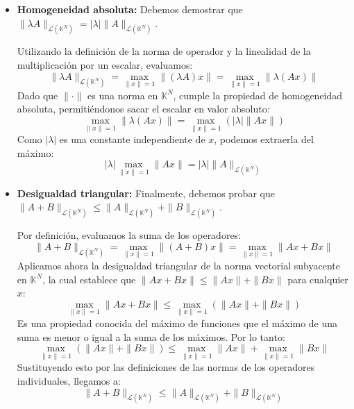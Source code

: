 {\begin{itemize}
        Para cualquier vector arbitrario $y \neq 0$ en $\mathbb{K}^N$, podemos construir el vector unitario $u = \frac{y}{\|y\|}$. Aplicando la linealidad del operador $A$:
        $$ A(u) = A\left(\frac{y}{\|y\|}\right) = \frac{1}{\|y\|} Ay = 0 \implies Ay = 0 $$
        Como $A0 = 0$ trivialmente, concluimos que $Ay = 0$ para todo $y \in \mathbb{K}^N$, lo que significa que $A$ es el operador nulo ($A = 0$). 

        La implicación inversa es directa: si $A = 0$, entonces $Ax = 0$ para todo $x$, lo que hace que $\|Ax\| = 0$ y, por tanto, su máximo sobre los vectores unitarios es $0$.

        \item \textbf{Homogeneidad absoluta:}
        Debemos demostrar que $\|\lambda A\|_{\mathcal{L}(\mathbb{K}^N)} = |\lambda| \|A\|_{\mathcal{L}(\mathbb{K}^N)}$.

        Utilizando la definición de la norma de operador y la linealidad de la multiplicación por un escalar, evaluamos:
        $$ \|\lambda A\|_{\mathcal{L}(\mathbb{K}^N)} = \max_{\|x\| = 1} \|(\lambda A)x\| = \max_{\|x\| = 1} \|\lambda (Ax)\| $$
        Dado que $\|\cdot\|$ es una norma en $\mathbb{K}^N$, cumple la propiedad de homogeneidad absoluta, permitiéndonos sacar el escalar en valor absoluto:
        $$ \max_{\|x\| = 1} \|\lambda (Ax)\| = \max_{\|x\| = 1} \left( |\lambda| \|Ax\| \right) $$
        Como $|\lambda|$ es una constante independiente de $x$, podemos extraerla del máximo:
        $$ |\lambda| \max_{\|x\| = 1} \|Ax\| = |\lambda| \|A\|_{\mathcal{L}(\mathbb{K}^N)} $$

        \item \textbf{Desigualdad triangular:}
        Finalmente, debemos probar que $\|A + B\|_{\mathcal{L}(\mathbb{K}^N)} \leq \|A\|_{\mathcal{L}(\mathbb{K}^N)} + \|B\|_{\mathcal{L}(\mathbb{K}^N)}$.

        Por definición, evaluamos la suma de los operadores:
        $$ \|A + B\|_{\mathcal{L}(\mathbb{K}^N)} = \max_{\|x\| = 1} \|(A + B)x\| = \max_{\|x\| = 1} \|Ax + Bx\| $$
        Aplicamos ahora la desigualdad triangular de la norma vectorial subyacente en $\mathbb{K}^N$, la cual establece que $\|Ax + Bx\| \leq \|Ax\| + \|Bx\|$ para cualquier $x$:
        $$ \max_{\|x\| = 1} \|Ax + Bx\| \leq \max_{\|x\| = 1} \left( \|Ax\| + \|Bx\| \right) $$
        Es una propiedad conocida del máximo de funciones que el máximo de una suma es menor o igual a la suma de los máximos. Por lo tanto:
        $$ \max_{\|x\| = 1} \left( \|Ax\| + \|Bx\| \right) \leq \max_{\|x\| = 1} \|Ax\| + \max_{\|x\| = 1} \|Bx\| $$
        Sustituyendo esto por las definiciones de las normas de los operadores individuales, llegamos a:
        $$ \|A + B\|_{\mathcal{L}(\mathbb{K}^N)} \leq \|A\|_{\mathcal{L}(\mathbb{K}^N)} + \|B\|_{\mathcal{L}(\mathbb{K}^N)} $$
    \end{itemize}    
}

